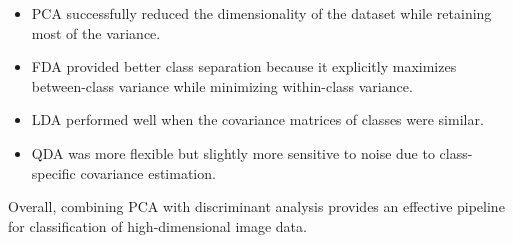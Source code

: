 \documentclass[12pt]{article}
\begin{document}
\begin{itemize}

\item PCA successfully reduced the dimensionality of the dataset while retaining most of the variance.

\item FDA provided better class separation because it explicitly maximizes between-class variance while minimizing within-class variance.

\item LDA performed well when the covariance matrices of classes were similar.

\item QDA was more flexible but slightly more sensitive to noise due to class-specific covariance estimation.

\end{itemize}

Overall, combining PCA with discriminant analysis provides an effective pipeline for classification of high-dimensional image data.
\end{document}
